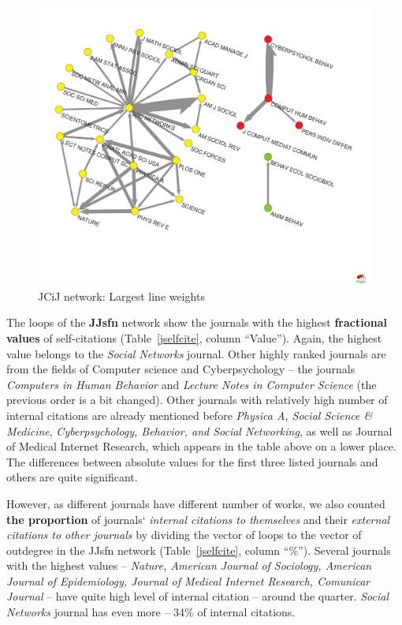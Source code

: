 \documentclass[11pt]{article} %
\begin{document}
\begin{figure}
\begin{center}
\includegraphics[width=150mm]{JCiJ_27.pdf}
\end{center}
\caption{JCiJ network: Largest line weights} \label{jcij}
\end{figure}
\medskip

The loops of the \textbf{JJsfn} network show the journals with the highest \textbf{fractional values} of self-citations (Table~\ref{jselfcite}, column ``Value''). Again, the highest value belongs to the \textit{Social Networks} journal. Other highly ranked journals are from the fields of Computer science and Cyberpsychology -- the journals \textit{Computers in Human Behavior} and \textit{Lecture Notes in Computer Science} (the previous order is a bit changed). Other journals with relatively high number of internal citations are already mentioned before \textit{Physica A, Social Science \& Medicine}, \textit{Cyberpsychology, Behavior, and Social Networking}, as well as {Journal of Medical Internet Research}, which appears in the table above on a lower place. The differences between absolute values for the first three listed journals and others are quite significant.   \medskip 

However, as different journals have different number of works, we also counted \textbf{the proportion} of journals` \textit{internal citations to themselves} and their \textit{external citations to other journals} by dividing the vector of loops to the vector of outdegree in the JJsfn network (Table~\ref{jselfcite}, column ``\%''). Several journals with the highest values -- \textit{Nature, American Journal of Sociology, American Journal of Epidemiology, Journal of Medical Internet Research, Comunicar Journal} -- have quite high level of internal citation -- around the quarter. \textit{Social Networks} journal has even more -- 34\% of internal citations. \medskip 
\end{document}
